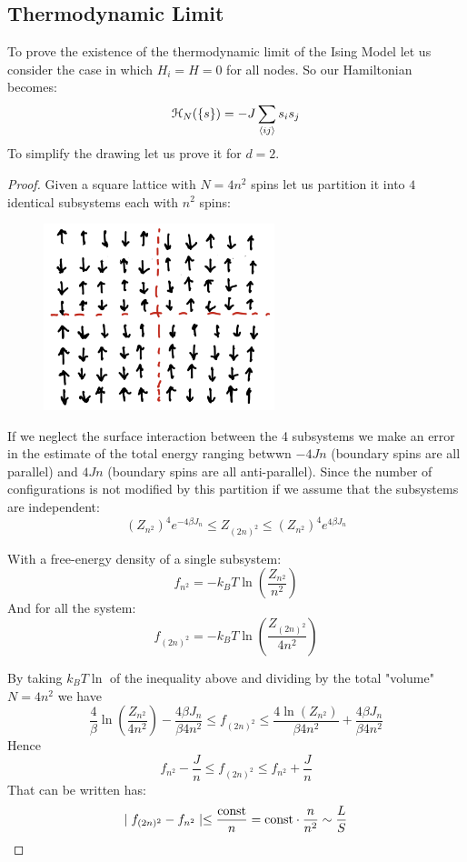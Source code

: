 \documentclass[../../Main/Main.tex]{subfiles}
\begin{document}

\subsection{Thermodynamic Limit}

To prove the existence of the thermodynamic limit of the Ising Model let us consider the case in which $H_{i} = H = 0$ for all nodes.
So our Hamiltonian becomes:
$$\mathcal{H}_{N}(\{ s \}) = -J \sum_{{\left< {ij} \right>}} s_{i}s_{j}$$
To simplify the drawing let us prove it for $d=2$.

\begin{proof}
Given a square lattice with $N= 4n^{2}$ spins let us partition it into $4$ identical subsystems each with $n^{2}$ spins:

\begin{figure}[h!]
\centering
\includegraphics[width=0.6\textwidth]{./img/IMAGE1.png}
\end{figure}


If we neglect the surface interaction between the 4 subsystems we make an error in the estimate of the total energy ranging betwwn $-4Jn$ (boundary spins are all parallel) and $4Jn$ (boundary spins are all anti-parallel).
Since the number of configurations is not modified by this partition if we assume that the subsystems are independent:
$$
(Z_{n^{2}})^{4} e^{-4\beta J_{n}} \leq Z_{(2n)^{2}} \leq (Z_{n^{2}})^{4}e^{4\beta J_{n}}
$$

With a free-energy density of a single subsystem:
$$f_{n^{2}} = -k_{B}T\ln\left( \frac{Z_{n^{2}}}{n^{2}} \right)$$
And for all the system:
$$f_{(2n)^{2}} = -k_{B}T\ln\left( \frac{Z_{(2n)^{2}}}{4n^{2}} \right)$$

By taking $k_{B}T\ln$ of the inequality above and dividing by the total "volume" $N = 4n^{2}$ we have
$$\frac{4}{\beta} \ln\left( \frac{Z_{n^{2}}}{4n^{2}} \right) - \frac{4\beta J_{n}}{\beta 4n^{2}} \leq f_{(2n)^{2}} \leq \frac{4\ln(Z_{n^{2}})}{\beta 4 n^{2}} + \frac{4\beta J_{n}}{\beta 4n^{2}}$$
Hence 
$$f_{n^{2}} - \frac{J}{n} \leq f_{(2n)^{2}} \leq f_{n^{2}} + \frac{J}{n}$$
That can be written has:
$$\mid f_{(2n)^{2}} - f_{n^{2}}\mid \leq \frac{\text{const}}{n} =\text{const} \cdot \frac{n}{n^{2}} \sim \frac{L}{S}$$


\end{proof}
\end{document}
